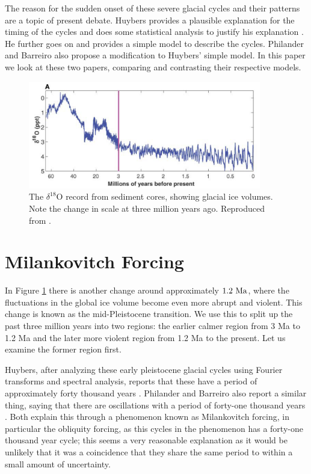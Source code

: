 \documentclass[11pt]{article}
\begin{document}
The reason for the sudden onset of these severe glacial cycles and their patterns are a topic of present debate.
Huybers provides a plausible explanation for the timing of the cycles and does some statistical analysis to justify his explanation \cite{huybers}.
He further goes on and provides a simple model to describe the cycles.
Philander and Barreiro also propose a modification to Huybers' simple model.
In this paper we look at these two papers, comparing and contrasting their respective models.

\begin{figure}
  \centering
  \includegraphics[width=4in]{d18o.png}
  \caption{The $\delta^{18}$O record from sediment cores, showing glacial ice volumes. Note the change in scale at three million years ago. Reproduced from \cite{huybers}.}
  \label{d18o}
\end{figure}

\section{Milankovitch Forcing}
In Figure \ref{d18o} there is another change around approximately $1.2~\textnormal{Ma}$, where the fluctuations in the global ice volume become even more abrupt and violent.
This change is known as the mid-Pleistocene transition.
We use this to split up the past three million years into two regions: the earlier calmer region from 3 Ma to 1.2 Ma and the later more violent region from 1.2 Ma to the present.
Let us examine the former region first.

Huybers, after analyzing these early pleistocene glacial cycles using Fourier transforms and spectral analysis, reports that these have a period of approximately forty thousand years \cite{huybers}.
Philander and Barreiro also report a similar thing, saying that there are oscillations with a period of forty-one thousand years \cite{philander}.
Both explain this through a phenomenon known as Milankovitch forcing, in particular the obliquity forcing, as this cycles in the phenomenon has a forty-one thousand year cycle; this seems a very reasonable explanation as it would be unlikely that it was a coincidence that they share the same period to within a small amount of uncertainty.
\end{document}

